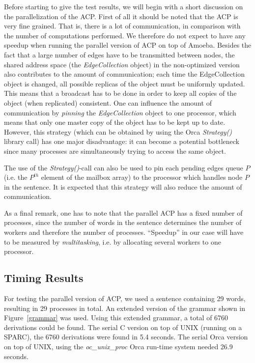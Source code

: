 Before starting to give the test results, we will begin
with a short discussion on the parallelization of the ACP. First of
all it should be noted that the ACP is very fine grained. That is,
there is a lot of communication,  
in comparison with the number of computations performed. We
therefore do not expect to have any speedup when running
the parallel version of ACP on top of Amoeba. Besides the fact that a
large number of edges have to be transmitted between nodes, the shared
address space (the {\em EdgeCollection} object) in the non-optimized
version also contributes to
the amount of communication; each time the EdgeCollection object is
changed, all possible replicas 
of the object must be uniformly updated. This means that a broadcast has to
be done in order to keep all copies of the object (when replicated)
consistent. One can influence the amount of communication by {\em
pinning} the {\em EdgeCollection} object to one processor, which means
that only one master copy of the object has to be kept up to date.
However, this strategy (which can be obtained by using the Orca {\em
Strategy()} library call) has one major disadvantage: it can become
a potential bottleneck since many processes are
simultaneously trying to access the same object.

The use of the {\em Strategy()}-call can also be used to pin each
pending edges queue $P$ (i.e. the $P^{th}$ element of the mailbox
array) to the processor which handles node $P$ in the sentence. It is
expected that this strategy will also reduce the amount of communication.

As a final remark, one has to note that the parallel ACP has a fixed
number of processes, since the number of words in the sentence
determines the number of workers and therefore the number of
processes. ``Speedup'' in our case will have to be measured by {\em
multitasking}, i.e. by allocating several workers to one processor.


\subsection{Timing Results}

For testing the parallel version of ACP, we used a sentence containing
29 words, resulting in 29 processes in total. An extended version of
the grammar shown in Figure~\ref{grammar} was used. Using this
extended grammar, a total of 6760 derivations could be found.
The serial C version on top of UNIX (running on a SPARC), the 6760
derivations were found in 5.4 seconds. The serial Orca
version on top of UNIX, using the {\em oc\_unix\_proc} Orca run-time
system needed 26.9 seconds. 

